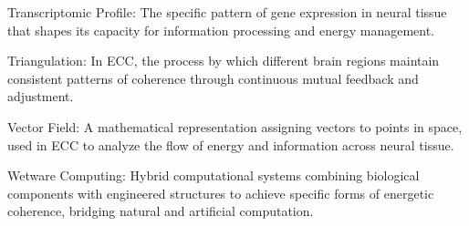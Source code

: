 Transcriptomic Profile: The specific pattern of gene expression in neural tissue that shapes its capacity for information processing and energy management.

Triangulation: In ECC, the process by which different brain regions maintain consistent patterns of coherence through continuous mutual feedback and adjustment.

Vector Field: A mathematical representation assigning vectors to points in space, used in ECC to analyze the flow of energy and information across neural tissue.

Wetware Computing: Hybrid computational systems combining biological components with engineered structures to achieve specific forms of energetic coherence, bridging natural and artificial computation.

